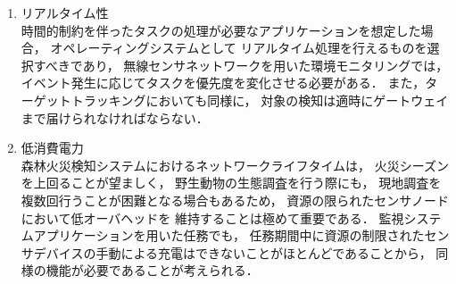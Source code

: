\begin{enumerate}
\item{リアルタイム性}\\
時間的制約を伴ったタスクの処理が必要なアプリケーションを想定した場合，
オペレーティングシステムとして
リアルタイム処理を行えるものを選択すべきであり，
無線センサネットワークを用いた環境モニタリングでは，
イベント発生に応じてタスクを優先度を変化させる必要がある．
また，ターゲットトラッキングにおいても同様に，
対象の検知は適時にゲートウェイまで届けられなければならない．
\newline
\item{低消費電力}\\
森林火災検知システムにおけるネットワークライフタイムは，
火災シーズンを上回ることが望ましく，
野生動物の生態調査を行う際にも，
現地調査を複数回行うことが困難となる場合もあるため，
資源の限られたセンサノードにおいて低オーバヘッドを
維持することは極めて重要である．
監視システムアプリケーションを用いた任務でも，
任務期間中に資源の制限されたセンサデバイスの手動による充電はできないことがほとんどであることから，
同様の機能が必要であることが考えられる．
\end{enumerate}



